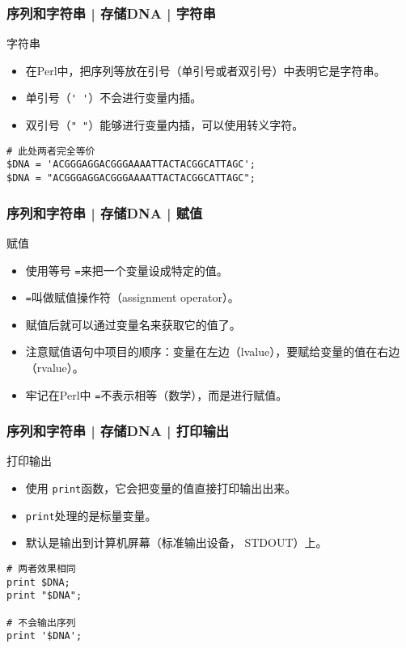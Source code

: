 \begin{frame}[fragile]
  \frametitle{序列和字符串 | 存储DNA | \alert{字符串}}
  \begin{block}{字符串}
    \begin{itemize}
      \item 在Perl中，把序列等放在引号（单引号或者双引号）中表明它是字符串。
      \item 单引号（\verb|' '|）不会进行变量内插。
      \item 双引号（\verb|" "|）能够进行变量内插，可以使用转义字符。
    \end{itemize}
  \end{block}
  \pause
\begin{lstlisting}
# 此处两者完全等价
$DNA = 'ACGGGAGGACGGGAAAATTACTACGGCATTAGC';
$DNA = "ACGGGAGGACGGGAAAATTACTACGGCATTAGC";
\end{lstlisting}
\end{frame}

\begin{frame}[fragile]
  \frametitle{序列和字符串 | 存储DNA | \alert{赋值}}
  \begin{block}{赋值}
    \begin{itemize}
      \item 使用等号 \verb|=|来把一个变量设成特定的值。
      \item \verb|=|叫做赋值操作符（assignment operator）。
      \item 赋值后就可以通过变量名来获取它的值了。
      \item 注意赋值语句中项目的顺序：变量在左边（lvalue），要赋给变量的值在右边（rvalue）。
      \item 牢记在Perl中 \verb|=|不表示相等（数学），而是进行赋值。
    \end{itemize}
  \end{block}
\end{frame}

\begin{frame}[fragile]
  \frametitle{序列和字符串 | 存储DNA | 打印输出}
  \begin{block}{打印输出}
    \begin{itemize}
      \item 使用 \verb|print|函数，它会把变量的值直接打印输出出来。
      \item \verb|print|处理的是标量变量。
      \item 默认是输出到计算机屏幕（标准输出设备， STDOUT）上。
    \end{itemize}
  \end{block}
  \pause
\begin{lstlisting}
# 两者效果相同
print $DNA;
print "$DNA";

# 不会输出序列
print '$DNA';
\end{lstlisting}
\end{frame}

